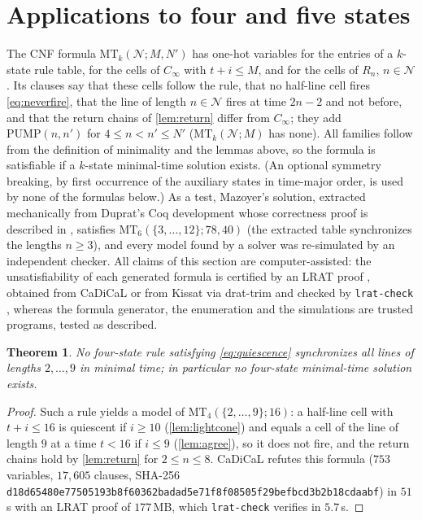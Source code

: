 \documentclass[3p]{elsarticle}
\newtheorem{theorem}{Theorem}[section]
\theoremstyle{remark}
\begin{document}
\section{Applications to four and five states}\label{sec:computations}

The CNF formula $\mathrm{MT}_k(\mathcal N;M,N')$ has one-hot variables for the
entries of a $k$-state rule table, for the cells of $C_\infty$ with
$t+i\le M$, and for the cells of $R_n$, $n\in\mathcal N$. Its clauses say that
these cells follow the rule, that no half-line cell fires
\eqref{eq:neverfire}, that the line of length $n\in\mathcal N$ fires at time
$2n-2$ and not before, and that the return chains of \cref{lem:return} differ
from $C_\infty$; they add $\mathrm{PUMP}(n,n')$ for $4\le n<n'\le N'$
($\mathrm{MT}_k(\mathcal N;M)$ has none). All families follow from the
definition of minimality and the lemmas above, so the formula is satisfiable
if a $k$-state minimal-time solution exists. (An optional symmetry breaking,
by first occurrence of the auxiliary states in time-major order, is used by
none of the formulas below.) As a test, Mazoyer's solution, extracted
mechanically from Duprat's Coq development \cite{Duprat97} whose correctness
proof is described in \cite{Duprat02}, satisfies
$\mathrm{MT}_6(\{3,\dots,12\};78,40)$ (the extracted table synchronizes the
lengths $n\ge3$), and every model found by a solver was re-simulated by an
independent checker. All claims of this section are computer-assisted: the
unsatisfiability of each generated formula is certified by an LRAT proof
\cite{CruzFilipeEtAl17}, obtained from CaDiCaL \cite{CaDiCaL2} or from Kissat
\cite{Kissat20} via \textsf{drat-trim} and checked by \texttt{lrat-check}
\cite{WetzlerHeuleHunt14}, whereas the formula generator, the enumeration and
the simulations are trusted programs, tested as described.

\begin{theorem}\label{thm:four}
No four-state rule satisfying \eqref{eq:quiescence} synchronizes all lines of
lengths $2,\dots,9$ in minimal time; in particular no four-state minimal-time
solution exists.
\end{theorem}

\begin{proof}
Such a rule yields a model of $\mathrm{MT}_4(\{2,\dots,9\};16)$: a half-line
cell with $t+i\le16$ is quiescent if $i\ge10$ (\cref{lem:lightcone}) and equals
a cell of the line of length $9$ at a time $t<16$ if $i\le9$
(\cref{lem:agree}), so it does not fire, and the return chains hold by
\cref{lem:return} for $2\le n\le8$. CaDiCaL refutes this formula ($753$
variables, $17{,}605$ clauses, SHA-256
\texttt{d18d65480e77505193b8f60362badad5}\allowbreak\texttt{e71f8f08505f29befbcd3b2b18cdaabf})
in $51$\,s with an LRAT proof of $177$\,MB, which \texttt{lrat-check} verifies
in $5.7$\,s.
\end{proof}
\end{document}
